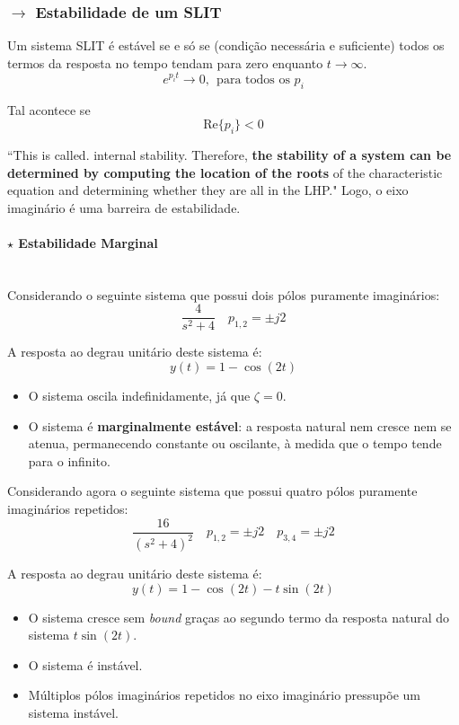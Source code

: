 \subsubsection[2.2.2 Estabilidade de um SLIT]{$\pmb{\rightarrow}$ Estabilidade de um SLIT}

\noindent Um sistema SLIT é estável se e só se (condição necessária e suficiente) todos os termos da resposta no tempo tendam para zero enquanto $t \to \infty$.
$$
    e^{p_i t} \to 0,\;\, \text{para todos os $p_i$}
$$

\noindent Tal acontece se
$$
    \boxed{\text{Re}\{p_i\} < 0}
$$

\noindent ``This is called. internal stability. Therefore, \textbf{the stability of a system can be determined by computing the location of the roots} of the characteristic equation and determining whether they are all in the LHP."\cite{FranklinPowell2015} Logo, o eixo imaginário é uma barreira de estabilidade.

\paragraph[2.2.2.1 Estabilidade Marginal]{$\pmb{\star}$ Estabilidade Marginal}\mbox{}\\

\noindent Considerando o seguinte sistema que possui dois pólos puramente imaginários:
$$
    \dfrac{4}{s^2 + 4}\quad p_{1,2} = \pm j2
$$

\noindent A resposta ao degrau unitário deste sistema é:
$$
  y(t) = 1 - \cos{(2t)}
$$

\begin{itemize}
    \item O sistema oscila indefinidamente, já que $\zeta = 0$.
    \item O sistema é \textbf{marginalmente estável}: a resposta natural nem cresce nem se atenua, permanecendo constante ou oscilante, à medida que o tempo tende para o infinito.
\end{itemize}

\noindent Considerando agora o seguinte sistema que possui quatro pólos puramente imaginários repetidos:
$$
    \dfrac{16}{(s^2 + 4)^2}\quad p_{1,2} = \pm j2\quad p_{3,4} = \pm j2
$$

\noindent A resposta ao degrau unitário deste sistema é:
$$
  y(t) = 1 - \cos{(2t)} - t\sin{(2t)}
$$

\begin{itemize}
    \item O sistema cresce sem \textit{bound} graças ao segundo termo da resposta natural do sistema $t\sin{(2t)}$.
    \item O sistema é instável.
    \item Múltiplos pólos imaginários repetidos no eixo imaginário pressupõe um sistema instável.
\end{itemize}

